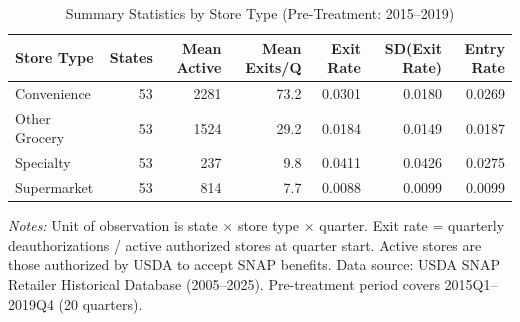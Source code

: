 \begin{table}[t]
\centering
\caption{Summary Statistics by Store Type (Pre-Treatment: 2015--2019)}
\label{tab:summary}
\footnotesize
\begin{tabular}{lrrrrrr}
\toprule
Store Type & States & Mean Active & Mean Exits/Q & Exit Rate & SD(Exit Rate) & Entry Rate \\
\midrule
Convenience & 53 & 2281 & 73.2 & 0.0301 & 0.0180 & 0.0269 \\
Other Grocery & 53 & 1524 & 29.2 & 0.0184 & 0.0149 & 0.0187 \\
Specialty & 53 & 237 & 9.8 & 0.0411 & 0.0426 & 0.0275 \\
Supermarket & 53 & 814 & 7.7 & 0.0088 & 0.0099 & 0.0099 \\
\bottomrule
\end{tabular}
\begin{tablenotes}
\item \textit{Notes:} Unit of observation is state $\times$ store type $\times$ quarter. Exit rate = quarterly deauthorizations / active authorized stores at quarter start. Active stores are those authorized by USDA to accept SNAP benefits. Data source: USDA SNAP Retailer Historical Database (2005--2025). Pre-treatment period covers 2015Q1--2019Q4 (20 quarters).
\end{tablenotes}
\end{table}

